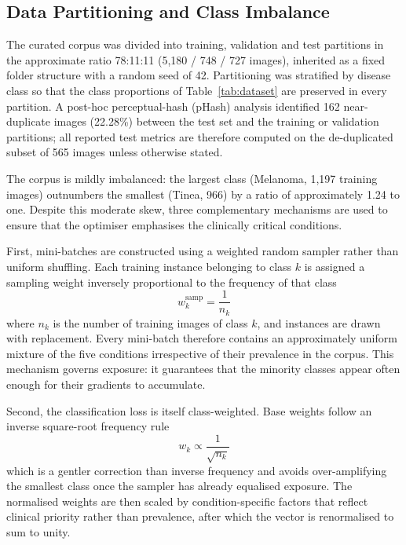 \documentclass[pdflatex,sn-mathphys-num]{sn-jnl}%
\begin{document}
\subsection{Data Partitioning and Class Imbalance}\label{sec:imbalance}

The curated corpus was divided into training, validation and test partitions in the
approximate ratio 78:11:11 (5,180 / 748 / 727 images), inherited as a fixed folder
structure with a random seed of 42. Partitioning was stratified by disease class so that the
class proportions of Table~\ref{tab:dataset} are preserved in every partition. A post-hoc
perceptual-hash (pHash) analysis\label{sec:dedup} identified 162 near-duplicate images (22.28\%) between the
test set and the training or validation partitions; all reported test metrics are therefore
computed on the de-duplicated subset of 565 images unless otherwise stated.

The corpus is mildly imbalanced: the largest class (Melanoma, 1,197 training images)
outnumbers the smallest (Tinea, 966) by a ratio of approximately 1.24 to one. Despite this
moderate skew, three complementary mechanisms are used to ensure that the optimiser
emphasises the clinically critical conditions.

First, mini-batches are constructed using a weighted random sampler rather than uniform
shuffling. Each training instance belonging to class $k$ is assigned a sampling weight
inversely proportional to the frequency of that class
\begin{equation}
w^{\mathrm{samp}}_{k} = \frac{1}{n_{k}}
\end{equation}
where $n_{k}$ is the number of training images of class $k$, and instances are drawn with
replacement. Every mini-batch therefore contains an approximately uniform mixture of the five
conditions irrespective of their prevalence in the corpus. This mechanism governs exposure:
it guarantees that the minority classes appear often enough for their gradients to accumulate.

Second, the classification loss is itself class-weighted. Base weights follow an inverse
square-root frequency rule
\begin{equation}
w_{k} \propto \frac{1}{\sqrt{n_{k}}}
\end{equation}
which is a gentler correction than inverse frequency and avoids over-amplifying the smallest
class once the sampler has already equalised exposure. The normalised weights are then scaled
by condition-specific factors that reflect clinical priority rather than prevalence, after
which the vector is renormalised to sum to unity.
\end{document}
